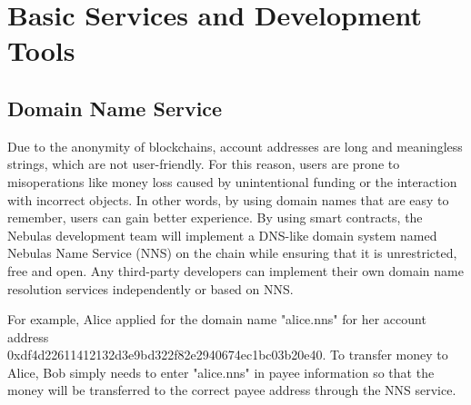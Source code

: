\section{Basic Services and Development Tools}
\label{sec:tools}

\subsection{Domain Name Service}

Due to the anonymity of blockchains, account addresses are long and meaningless strings, which are not user-friendly. For this reason, users are prone to misoperations like money loss caused by unintentional funding or the interaction with incorrect objects. In other words, by using domain names that are easy to remember, users can gain better experience. By using smart contracts, the Nebulas development team will implement a DNS-like domain system named Nebulas Name Service (NNS) on the chain while ensuring that it is unrestricted, free and open. Any third-party developers can implement their own domain name resolution services independently or based on NNS.


For example, Alice applied for the domain name "alice.nns" for her account address \\0xdf4d22611412132d3e9bd322f82e2940674ec1bc03b20e40. To transfer money to Alice, Bob simply needs to enter "alice.nns" in payee information so that the money will be transferred to the correct payee address through the NNS service.


